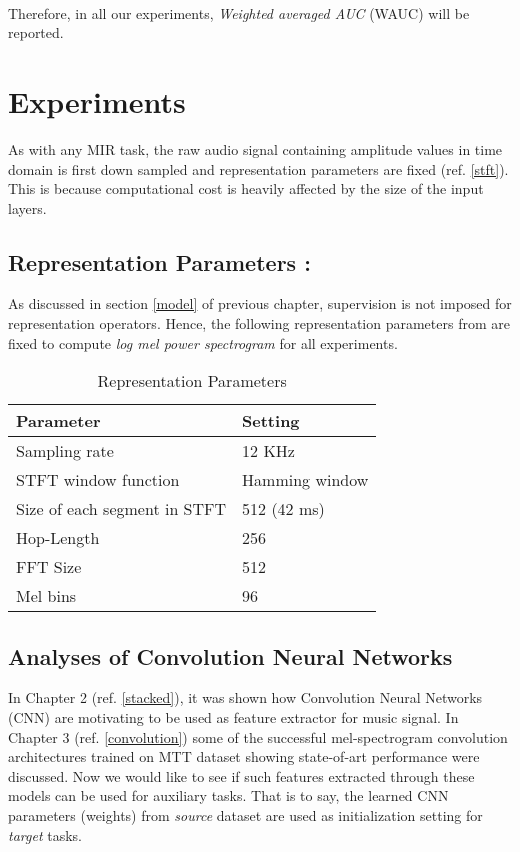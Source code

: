 \\
Therefore, in all our experiments, \textit{Weighted averaged AUC} (WAUC) will be reported.

\section{Experiments}
\label{experiments}
 
As with any MIR task, the raw audio signal containing amplitude values in time domain is first down sampled and representation parameters are fixed (ref. \ref{stft}). This is because computational cost is heavily affected by the size of the input layers.

\subsection{Representation Parameters :}
\label{repPara}
As discussed in section \ref{model} of previous chapter, supervision is not imposed for representation operators. Hence, the following  representation parameters from \cite{choi_cnn} are fixed to compute \textit{log mel power spectrogram} for all experiments. 

\begin{table}[H]
\label{tab:repPara}
\centering
\begin{tabular}{| p{} | p{}|}
\hline
\textbf{Parameter} & \textbf{Setting}\\
\hline
Sampling rate & 12 KHz\\
\hline
STFT window function & Hamming window\\
\hline
Size of each segment in STFT & 512 (42 ms)\\
\hline
Hop-Length & 256\\
\hline
FFT Size & 512\\
\hline
Mel bins & 96\\
\hline
\end{tabular}
\caption{Representation Parameters} 
\end{table}

\subsection{Analyses of Convolution Neural Networks}
\label{pretrained}
In Chapter 2 (ref. \ref{stacked}), it was shown how Convolution Neural Networks (CNN) are motivating to be used as feature extractor for music signal. In Chapter 3 (ref. \ref{convolution}) some of the successful mel-spectrogram convolution architectures trained on MTT dataset showing state-of-art performance were discussed. Now we would like to see if such features extracted through these models can be used for auxiliary tasks. That is to say, the learned CNN parameters (weights) from \textit{source} dataset are used as initialization setting for \textit{target} tasks.    
\bigskip

